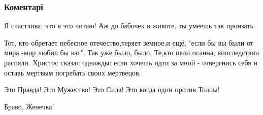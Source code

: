  
 
 
 
 
\subsubsection{Коментарі}
\label{sec:24_08_2021.fb.bilchenko_evgenia.1.den_nezavisimosti_strana.cmt}

\begin{itemize}
 
Я счастлива, что я это читаю! Аж до бабочек в животе, ты умеешь так пронзать.

 

Тот, кто обретает небесное отечество,теряет земное.и ещё, "если бы вы были от
мира -мир любил бы вас". Так уже было, было. Те,кто пели осанна, впоследствии
распяли. Христос сказал однажды: если хочешь идти за мной - отвергнись себя и
оставь мертвым погребать своих мертвецов.


 
Это Правда! Это Мужество! Это Сила! Это когда один против Толпы!

 
Браво, Женечка!


\end{itemize}
